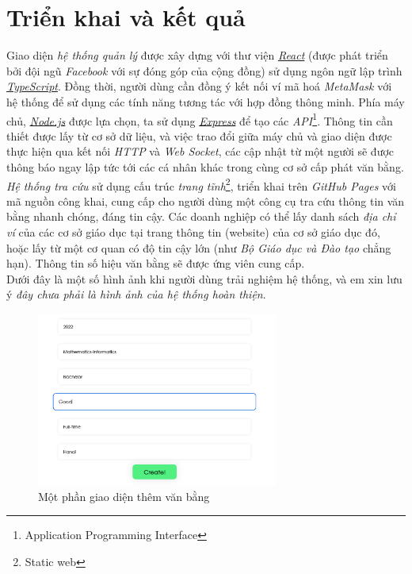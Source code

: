 \newpage
\section{Triển khai và kết quả}

Giao diện \textit{hệ thống quản lý} được xây dựng với thư viện \href{https://reactjs.org}{\textit{React}} (được phát triển bởi đội ngũ \textit{Facebook} với sự đóng góp của cộng đồng) sử dụng ngôn ngữ lập trình \href{https://www.typescriptlang.org/}{\textit{TypeScript}}. Đồng thời, người dùng cần đồng ý kết nối ví mã hoá \textit{MetaMask} với hệ thống để sử dụng các tính năng tương tác với hợp đồng thông minh. Phía máy chủ, \href{https://nodejs.org}{\textit{Node.js}} được lựa chọn, ta sử dụng \href{https://expressjs.com/}{\textit{Express}} để tạo các \textit{API}\footnote{Application Programming Interface}. Thông tin cần thiết được lấy từ cơ sở dữ liệu, và việc trao đổi giữa máy chủ và giao diện được thực hiện qua kết nối \textit{HTTP} và \textit{Web Socket}, các cập nhật từ một người sẽ được thông báo ngay lập tức tới các cá nhân khác trong cùng cơ sở cấp phát văn bằng.\\

\textit{Hệ thống tra cứu} sử dụng cấu trúc \textit{trang tĩnh}\footnote{Static web}, triển khai trên \textit{GitHub Pages} với mã nguồn công khai, cung cấp cho người dùng một công cụ tra cứu thông tin văn bằng nhanh chóng, đáng tin cậy. Các doanh nghiệp có thể lấy danh sách \textit{địa chỉ ví} của các cơ sở giáo dục tại trang thông tin (website) của cơ sở giáo dục đó, hoặc lấy từ một cơ quan có độ tin cậy lớn (như \textit{Bộ Giáo dục và Đào tạo} chẳng hạn). Thông tin số hiệu văn bằng sẽ được ứng viên cung cấp.\\

Dưới đây là một số hình ảnh khi người dùng trải nghiệm hệ thống, và em xin lưu ý \textit{đây chưa phải là hình ảnh của hệ thống hoàn thiện}.\\

\begin{figure}[!ht]
    \centering
    \includegraphics[width=300px]{images/app-create-cert.png}
    \caption{Một phần giao diện thêm văn bằng}
\end{figure}

